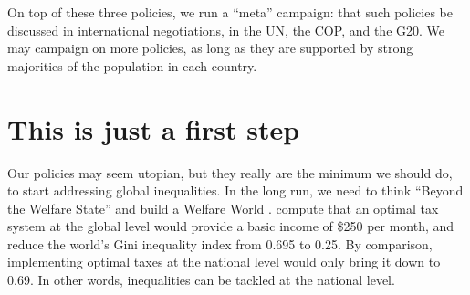 \documentclass[12pt,english]{article}
\begin{document}
On top of these three policies, we run a ``meta'' campaign: that such policies be discussed in international negotiations, in the UN, the COP, and the G20. 
We may campaign on more policies, as long as they are supported by strong majorities of the population in each country. 




\section{This is just a first step}

Our policies may seem utopian, but they really are the minimum we should do, to start addressing global inequalities. In the long run, we need to think ``Beyond the Welfare State'' and build a Welfare World \citep{myrdal_beyond_1960}. \citet{kopczuk_limitations_2005} compute that an optimal tax system at the global level would provide a basic income of \$250 per month, and reduce the world's Gini inequality index from 0.695 to 0.25. By comparison, implementing optimal taxes at the national level would only bring it down to 0.69. In other words, inequalities can be tackled at the national level. 

\end{document}
